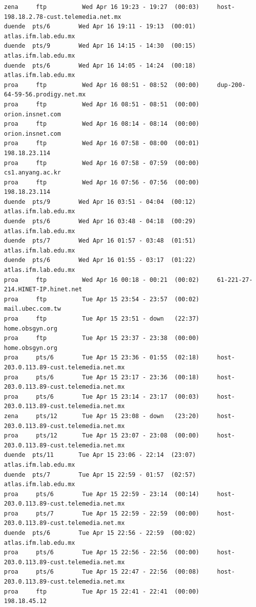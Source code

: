 \begin{lstlisting}[style=terminal]
zena     ftp          Wed Apr 16 19:23 - 19:27  (00:03)     host-198.18.2.78-cust.telemedia.net.mx
duende  pts/6        Wed Apr 16 19:11 - 19:13  (00:01)     atlas.ifm.lab.edu.mx
duende  pts/9        Wed Apr 16 14:15 - 14:30  (00:15)     atlas.ifm.lab.edu.mx
duende  pts/6        Wed Apr 16 14:05 - 14:24  (00:18)     atlas.ifm.lab.edu.mx
proa     ftp          Wed Apr 16 08:51 - 08:52  (00:00)     dup-200-64-59-56.prodigy.net.mx
proa     ftp          Wed Apr 16 08:51 - 08:51  (00:00)     orion.insnet.com
proa     ftp          Wed Apr 16 08:14 - 08:14  (00:00)     orion.insnet.com
proa     ftp          Wed Apr 16 07:58 - 08:00  (00:01)     198.18.23.114
proa     ftp          Wed Apr 16 07:58 - 07:59  (00:00)     cs1.anyang.ac.kr
proa     ftp          Wed Apr 16 07:56 - 07:56  (00:00)     198.18.23.114
duende  pts/9        Wed Apr 16 03:51 - 04:04  (00:12)     atlas.ifm.lab.edu.mx
duende  pts/6        Wed Apr 16 03:48 - 04:18  (00:29)     atlas.ifm.lab.edu.mx
duende  pts/7        Wed Apr 16 01:57 - 03:48  (01:51)     atlas.ifm.lab.edu.mx
duende  pts/6        Wed Apr 16 01:55 - 03:17  (01:22)     atlas.ifm.lab.edu.mx
proa     ftp          Wed Apr 16 00:18 - 00:21  (00:02)     61-221-27-214.HINET-IP.hinet.net
proa     ftp          Tue Apr 15 23:54 - 23:57  (00:02)     mail.ubec.com.tw
proa     ftp          Tue Apr 15 23:51 - down   (22:37)     home.obsgyn.org
proa     ftp          Tue Apr 15 23:37 - 23:38  (00:00)     home.obsgyn.org
proa     pts/6        Tue Apr 15 23:36 - 01:55  (02:18)     host-203.0.113.89-cust.telemedia.net.mx
proa     pts/6        Tue Apr 15 23:17 - 23:36  (00:18)     host-203.0.113.89-cust.telemedia.net.mx
proa     pts/6        Tue Apr 15 23:14 - 23:17  (00:03)     host-203.0.113.89-cust.telemedia.net.mx
zena     pts/12       Tue Apr 15 23:08 - down   (23:20)     host-203.0.113.89-cust.telemedia.net.mx
proa     pts/12       Tue Apr 15 23:07 - 23:08  (00:00)     host-203.0.113.89-cust.telemedia.net.mx
duende  pts/11       Tue Apr 15 23:06 - 22:14  (23:07)     atlas.ifm.lab.edu.mx
duende  pts/7        Tue Apr 15 22:59 - 01:57  (02:57)     atlas.ifm.lab.edu.mx
proa     pts/6        Tue Apr 15 22:59 - 23:14  (00:14)     host-203.0.113.89-cust.telemedia.net.mx
proa     pts/7        Tue Apr 15 22:59 - 22:59  (00:00)     host-203.0.113.89-cust.telemedia.net.mx
duende  pts/6        Tue Apr 15 22:56 - 22:59  (00:02)     atlas.ifm.lab.edu.mx
proa     pts/6        Tue Apr 15 22:56 - 22:56  (00:00)     host-203.0.113.89-cust.telemedia.net.mx
proa     pts/6        Tue Apr 15 22:47 - 22:56  (00:08)     host-203.0.113.89-cust.telemedia.net.mx
proa     ftp          Tue Apr 15 22:41 - 22:41  (00:00)     198.18.45.12

\end{lstlisting}
